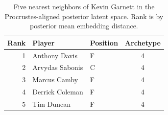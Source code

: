 \begin{table}[htbp]
  \centering\small
  \begin{tabular}{rllc}
    \toprule
    Rank & Player & Position & Archetype \\
    \midrule
    1 & Anthony Davis & F & 4 \\
    2 & Arvydas Sabonis & C & 4 \\
    3 & Marcus Camby & F & 4 \\
    4 & Derrick Coleman & F & 4 \\
    5 & Tim Duncan & F & 4 \\
    \bottomrule
  \end{tabular}
  \caption{Five nearest neighbors of Kevin Garnett in the Procrustes-aligned posterior latent space. Rank is by posterior mean embedding distance.}
  \label{tab:Kevin_Garnett_neighbors}
\end{table}

